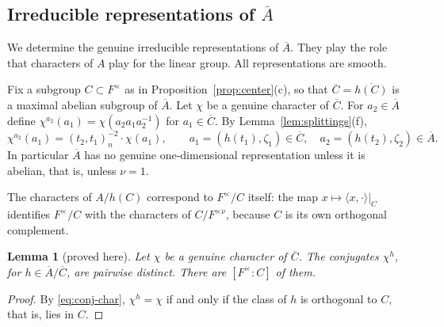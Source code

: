 \documentclass[12pt,letterpaper]{article}
\numberwithin{equation}{section}
\newtheorem{lemma}[theorem]{Lemma}
\theoremstyle{definition}
\newcommand{\proved}{proved here}
\newcommand{\bA}{\overline{A}}
\newcommand{\bC}{\overline{C}}
\begin{document}
\subsection{\texorpdfstring{Irreducible representations of $\bA$}{Irreducible representations of A}}\label{subsec:torus-reps}

We determine the genuine irreducible representations of $\bA$.  They play the role that
characters of $A$ play for the linear group.  All representations are smooth.

Fix a subgroup $C\subset F^\times$ as in Proposition~\ref{prop:center}(c), so that
$\bC=\overline{h(C)}$ is a maximal abelian subgroup of $\bA$.  Let $\chi$ be a genuine
character of $\bC$.  For $a_2\in\bA$ define $\chi^{a_2}(a_1)=\chi(a_2a_1a_2^{-1})$ for
$a_1\in\bC$.  By Lemma~\ref{lem:splittings}(f),
\begin{equation}\label{eq:conj-char}
\chi^{a_2}(a_1)=(t_2,t_1)_n^{-2}\cdot\chi(a_1),\qquad
a_1=(h(t_1),\zeta_1)\in\bC,\quad a_2=(h(t_2),\zeta_2)\in\bA .
\end{equation}
In particular $\bA$ has no genuine one-dimensional representation unless it is abelian,
that is, unless $\nu=1$.

The characters of $A/h(C)$ correspond to $F^\times/C$ itself: the map
$x\mapsto\langle x,\cdot\rangle|_C$ identifies $F^\times/C$ with the characters of
$C/F^{\times\nu}$, because $C$ is its own orthogonal complement.

\begin{lemma}[\proved]\label{lem:conjugates}
Let $\chi$ be a genuine character of $\bC$.  The conjugates $\chi^h$, for
$h\in\bA/\bC$, are pairwise distinct.  There are $[F^\times:C]$ of them.
\end{lemma}
\begin{proof}
By \eqref{eq:conj-char}, $\chi^{h}=\chi$ if and only if the class of $h$ is orthogonal to
$C$, that is, lies in $C$.
\end{proof}
\end{document}
